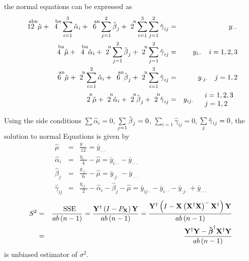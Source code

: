 \documentclass{article}
\begin{document}
the normal equations can be expressed as%
\begin{eqnarray*}
\overset{\text{abn}}{12}\hat{\mu}+\overset{\text{bn}}{4}\sum\limits_{i=1}^{3}%
\hat{\alpha}_{i}+\overset{\text{an}}{6}\sum\limits_{j=1}^{2}\hat{\beta}_{j}+%
\overset{\text{n}}{2}\sum\limits_{i=1}^{3}\sum\limits_{j=1}^{2}\hat{\gamma}%
_{ij} &=&y_{\cdot \cdot \cdot } \\
\overset{\text{bn}}{4}\hat{\mu}+\overset{\text{bn}}{4}\hat{\alpha}_{i}+%
\overset{\text{n}}{2}\sum\limits_{j=1}^{2}\hat{\beta}_{j}+\overset{\text{n}}{%
2}\sum\limits_{j=1}^{2}\hat{\gamma}_{ij} &=&y_{i\cdot \cdot }\quad i=1,2,3 \\
\overset{\text{an}}{6}\hat{\mu}+\overset{\text{n}}{2}\sum\limits_{i=1}^{2}%
\hat{\alpha}_{i}+\overset{\text{an}}{6}\hat{\beta}_{j}+\overset{\text{n}}{2}%
\sum\limits_{i=1}^{3}\hat{\gamma}_{ij} &=&y_{\cdot j\cdot }\quad j=1,2 \\
\overset{\text{n}}{2}\hat{\mu}+\overset{\text{n}}{2}\hat{\alpha}_{i}+\overset%
{\text{n}}{2}\hat{\beta}_{j}+\overset{\text{n}}{2}\hat{\gamma}_{ij}
&=&y_{ij\cdot }\quad 
\begin{tabular}{l}
$i=1,2,3$ \\ 
$j=1,2$%
\end{tabular}%
\end{eqnarray*}

Using the side conditions $\sum \hat{\alpha}_{i}=0$, $\sum\limits_{j=1}\hat{%
\beta}_{j}=0$, $\sum\limits_{i=1}\hat{\gamma}_{ij}=0$, $\sum\limits_{j}\hat{%
\gamma}_{ij}=0$, the solution to normal Equations is given by%
\begin{eqnarray*}
\hat{\mu} &=&\frac{y_{\cdot \cdot \cdot }}{12}=\bar{y}_{\cdot \cdot \cdot }
\\
\hat{\alpha}_{i} &=&\frac{y_{i\cdot \cdot }}{4}-\hat{\mu}=\bar{y}_{i\cdot
\cdot }-\bar{y}_{\cdot \cdot \cdot } \\
\hat{\beta}_{j} &=&\frac{y_{\cdot j\cdot }}{6}-\hat{\mu}=\bar{y}_{\cdot
j\cdot }-\bar{y}_{\cdot \cdot \cdot } \\
\hat{\gamma}_{ij} &=&\frac{y_{ij\cdot }}{2}-\hat{\alpha}_{i}-\hat{\beta}_{j}-%
\hat{\mu}=\bar{y}_{ij\cdot }-\bar{y}_{i\cdot \cdot }-\bar{y}_{\cdot j\cdot }+%
\bar{y}_{\cdot \cdot \cdot }
\end{eqnarray*}%
\begin{eqnarray*}
S^{2} &=&\frac{\text{SSE}}{ab\left( n-1\right) }=\frac{\mathbf{Y}^{\dagger
}\left( I-P_{\mathbf{X}}\right) \mathbf{Y}}{ab\left( n-1\right) }=\frac{%
\mathbf{Y}^{\dagger }\left( I-\mathbf{X}\left( \mathbf{X}^{\dagger }\mathbf{X%
}\right) ^{-}\mathbf{X}^{\dagger }\right) \mathbf{Y}}{ab\left( n-1\right) }
\\
&=&\frac{\mathbf{Y}^{\dagger }\mathbf{Y}-\mathbf{\hat{\beta}}^{\dagger }%
\mathbf{X}^{\dagger }\mathbf{Y}}{ab\left( n-1\right) }
\end{eqnarray*}%
is unbiased estimator of $\sigma ^{2}$.
\end{document}
